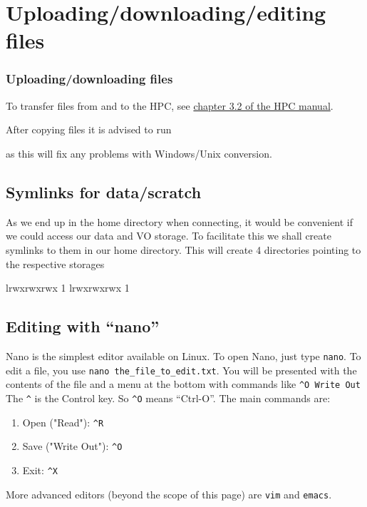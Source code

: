 \chapter{Uploading/downloading/editing files}

\subsection{Uploading/downloading files}

To transfer files from and to the HPC, see
\href{https://hpcugent.github.io/vsc_user_docs/pdf/intro-HPC-linux-gent.pdf#section.3.2}{chapter 3.2 of the HPC manual}.

\ifwindows

After copying files it is advised to run

\begin{prompt}
\end{prompt}

as this will fix any problems with Windows/Unix conversion.

\fi
\section{Symlinks for data/scratch}

As we end up in the home directory when connecting, it would be convenient if we
could access our data and VO storage. To facilitate this we shall create
symlinks to them in our home directory. This will create 4 directories pointing to the respective storages

\begin{prompt}
lrwxrwxrwx 1 %
lrwxrwxrwx 1 %
\end{prompt}

\section{Editing with ``nano''}

Nano is the simplest editor available on Linux. To open Nano, just type
\verb|nano|. To edit a file, you use \verb|nano the_file_to_edit.txt|. You will
be presented with the contents of the file and a menu at the bottom with
commands like \verb|^O Write Out| The \verb|^| is the Control key. So \verb|^O| means
``Ctrl-O''. The main commands are:

\begin{enumerate}
\item Open ("Read"): \verb|^R|
\item Save ("Write Out"): \verb|^O|
\item Exit: \verb|^X|
\end{enumerate}

More advanced editors (beyond the scope of this page) are \verb|vim| and \verb|emacs|.
